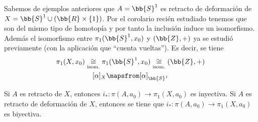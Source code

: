 \begin{ejemplo} Sabemos de ejemplos anteriores que $A=\bb{S}^1$ es retracto de deformación de $X=\bb{S}^1 \cup (\bb{R}\times\{1\})$. Por el corolario recién estudiado tenemos que son del mismo tipo de homotopía y por tanto la inclusión induce un isomorfismo. Además el isomorfismo entre $\pi_1(\bb{S}^1, x_0)$ y $(\bb{Z},+)$ ya se estudió previamente (con la aplicación que ``cuenta vueltas''). Es decir, se tiene
    \begin{gather*}
        \pi_1(X,x_0) \underset{\text{isom.}}{\cong} \pi_1(\bb{S}^1,x_0) \underset{\text{isom.}}{\cong} (\bb{Z},+)\\
        [\alpha]_X \mapsfrom [\alpha]_{\bb{S}^1}
    \end{gather*}
\end{ejemplo}

\begin{observacion}
    Si $A$ es retracto de $X$, entonces $i_*:\pi(A,a_0)\to \pi_1(X,a_0)$ es inyectiva. Si $A$ es retracto de deformación de $X$, entonces se tiene que $i_*:\pi(A,a_0)\to \pi_1(X,a_0)$ es biyectiva.
\end{observacion}


